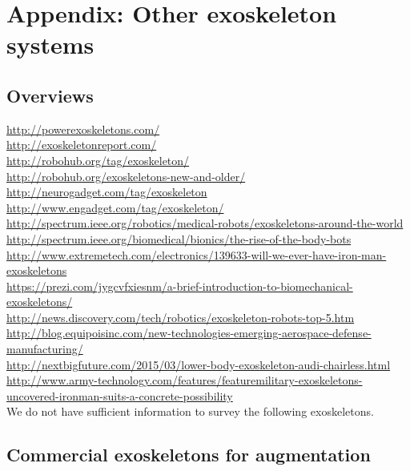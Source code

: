 
\section{Appendix: Other exoskeleton systems}

\subsection{Overviews}

\url{http://powerexoskeletons.com/}\\
\url{http://exoskeletonreport.com/}\\
\url{http://robohub.org/tag/exoskeleton/}\\
\url{http://robohub.org/exoskeletons-new-and-older/}\\
\url{http://neurogadget.com/tag/exoskeleton}\\
\url{http://www.engadget.com/tag/exoskeleton/}\\
\url{http://spectrum.ieee.org/robotics/medical-robots/exoskeletons-around-the-world}\\
\url{http://spectrum.ieee.org/biomedical/bionics/the-rise-of-the-body-bots}\\
\url{http://www.extremetech.com/electronics/139633-will-we-ever-have-iron-man-exoskeletons}\\
\url{https://prezi.com/jygcvfxiesnm/a-brief-introduction-to-biomechanical-exoskeletons/}\\
\url{http://news.discovery.com/tech/robotics/exoskeleton-robots-top-5.htm}\\
\url{http://blog.equipoisinc.com/new-technologies-emerging-aerospace-defense-manufacturing/}\\
\url{http://nextbigfuture.com/2015/03/lower-body-exoskeleton-audi-chairless.html}\\
\url{http://www.army-technology.com/features/featuremilitary-exoskeletons-uncovered-ironman-suits-a-concrete-possibility}\\


We do not have sufficient information to survey the following exoskeletons.\\


\subsection{Commercial exoskeletons for augmentation}


